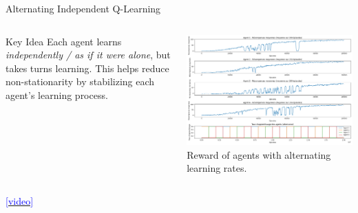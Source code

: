 \documentclass[aspectratio=169,xcolor=dvipsnames]{beamer}
\begin{document}
\begin{frame}{Alternating Independent Q-Learning}

    \begin{columns}[T] %
        \begin{block}{Key Idea}
            Each agent learns \emph{independently / as if it were alone}, but takes turns learning.  
            This helps reduce non-stationarity by stabilizing each agent’s learning process.
        \end{block}

        \centering
        \includegraphics[scale=0.23]{images/alt_learning.png} \\
        {\small Reward of agents with alternating learning rates.}
    \end{columns}

    \vspace{0.5cm}
    \begin{minipage}{0.2\textwidth}
    {\href{https://raw.githubusercontent.com/edabier/MARL-project/main/game_gif/AltIqlwin10.gif}{\textcolor{blue}{[video]}}}
    \end{minipage}
\end{frame}

\end{document}
